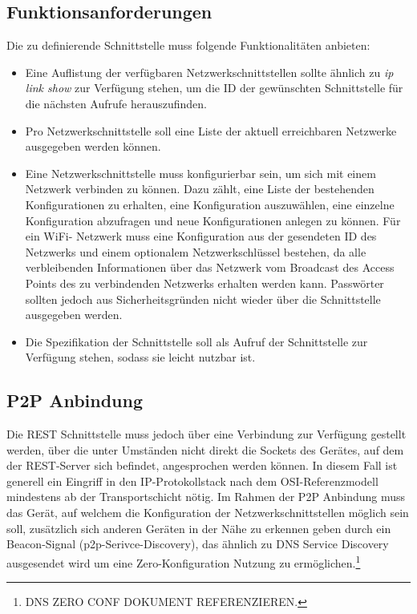 	\subsection{Funktionsanforderungen}

    Die zu definierende Schnittstelle muss folgende Funktionalitäten anbieten:
    \begin{itemize}
        \item Eine Auflistung der verfügbaren Netzwerkschnittstellen sollte ähnlich zu {\it ip link show} zur Verfügung stehen, um die ID der gewünschten Schnittstelle für die nächsten Aufrufe herauszufinden.
        \item Pro Netzwerkschnittstelle soll eine Liste der aktuell erreichbaren Netzwerke ausgegeben werden können.
        \item Eine Netzwerkschnittstelle muss konfigurierbar sein, um sich mit einem Netzwerk verbinden zu können. Dazu zählt, eine Liste der bestehenden Konfigurationen zu erhalten, eine Konfiguration auszuwählen, eine einzelne Konfiguration abzufragen und neue Konfigurationen anlegen zu können. Für ein WiFi- Netzwerk muss eine Konfiguration aus der gesendeten ID des Netzwerks und einem optionalem Netzwerkschlüssel bestehen, da alle verbleibenden Informationen über das Netzwerk vom Broadcast des Access Points des zu verbindenden Netzwerks erhalten werden kann.
        Passwörter sollten jedoch aus Sicherheitsgründen nicht wieder über die Schnittstelle ausgegeben werden.
        
        \item Die Spezifikation der Schnittstelle soll als Aufruf der Schnittstelle zur Verfügung stehen, sodass sie leicht nutzbar ist.
    \end{itemize}
    
    \subsection{P2P Anbindung}

	Die REST Schnittstelle muss jedoch über eine Verbindung zur Verfügung gestellt werden, über die unter Umständen nicht direkt die Sockets des Gerätes, auf dem der REST-Server sich befindet, angesprochen werden können. In diesem Fall ist generell ein Eingriff in den IP-Protokollstack nach dem OSI-Referenzmodell mindestens ab der Transportschicht nötig. Im Rahmen der P2P Anbindung muss das Gerät, auf welchem die Konfiguration der Netzwerkschnittstellen möglich sein soll, zusätzlich sich anderen Geräten in der Nähe zu erkennen geben durch ein Beacon-Signal (p2p-Serivce-Discovery), das ähnlich zu DNS Service Discovery ausgesendet wird um eine Zero-Konfiguration Nutzung zu ermöglichen.\footnote{DNS ZERO CONF DOKUMENT REFERENZIEREN.}
	

